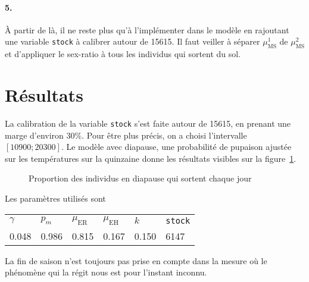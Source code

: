 \documentclass[a4paper, 11pt]{article}
\begin{document}
\paragraph{5.} À partir de là, il ne reste plus qu'à l'implémenter dans le modèle en rajoutant une variable \texttt{stock} à calibrer autour de 15615. Il faut veiller à séparer $\mu_{\text{MS}}^1$ de 
$\mu_{\text{MS}}^2$ et d'appliquer le sex-ratio à tous les individus qui sortent du sol.

\section*{Résultats}

La calibration de la variable \texttt{stock} s'est faite autour de 15615, en prenant une marge d'environ 30\%. Pour être plus précis, on a choisi l'intervalle $[10900;20300]$.
Le modèle avec diapause, une probabilité de pupaison ajustée sur les températures sur la quinzaine donne les résultats visibles sur la figure~\ref{diap}.
\begin{figure}[ht]
 \centering
 \caption{Proportion des individus en diapause qui sortent chaque jour}
 \label{diap}
\end{figure}

Les paramètres utilisés sont 
\begin{center}
\begin{tabular}{llllll}
$\gamma$ & $p_m$ & $\mu_{\text{ER}}$ & $\mu_{\text{EH}}$ & $k$ & \texttt{stock}\\
0.048 & 0.986 & 0.815 & 0.167 & 0.150 & 6147
\end{tabular}
\end{center}

La fin de saison n'est toujours pas prise en compte dans la mesure où le phénomène qui la régit nous est pour l'instant inconnu.



\clearpage

\end{document}
